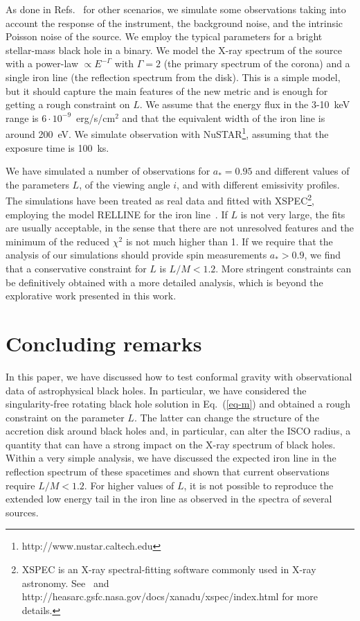 \documentclass[aps, prd, amsmath, floats, floatfix, twocolumn, nofootinbib, superscriptaddress, showpacs]{revtex4-1}
\begin{document}
As done in Refs.~\cite{p1,p2,p3,p4} for other scenarios, we simulate some observations taking into account the response of the instrument, the background noise, and the intrinsic Poisson noise of the source. We employ the typical parameters for a bright stellar-mass black hole in a binary. We model the X-ray spectrum of the source with a power-law $\propto E^{-\Gamma}$ with $\Gamma = 2$ (the primary spectrum of the corona) and a single iron line (the reflection spectrum from the disk). This is a simple model, but it should capture the main features of the new metric and is enough for getting a rough constraint on $L$. We assume that the energy flux in the 3-10~keV range is $6 \cdot 10^{-9}$~erg/s/cm$^2$ and that the equivalent width of the iron line is around 200~eV. We simulate observation with NuSTAR\footnote{http://www.nustar.caltech.edu}, assuming that the exposure time is 100~ks. 


We have simulated a number of observations for $a_* = 0.95$ and different values of the parameters $L$, of the viewing angle $i$, and with different emissivity profiles. The simulations have been treated as real data and fitted with XSPEC\footnote{XSPEC is an X-ray spectral-fitting software commonly used in X-ray astronomy. See~\cite{arn96} and http://heasarc.gsfc.nasa.gov/docs/xanadu/xspec/index.html for more details.}, employing the model RELLINE for the iron line~\cite{relline}. If $L$ is not very large, the fits are usually acceptable, in the sense that there are not unresolved features and the minimum of the reduced $\chi^2$ is not much higher than 1. If we require that the analysis of our simulations should provide spin measurements $a_* > 0.9$, we find that a conservative constraint for $L$ is $L/M < 1.2$. More stringent constraints can be definitively obtained with a more detailed analysis, which is beyond the explorative work presented in this work.





\section{Concluding remarks}

In this paper, we have discussed how to test conformal gravity with observational data of astrophysical black holes. In particular, we have considered the singularity-free rotating black hole solution in Eq.~(\ref{eq-m}) and obtained a rough constraint on the parameter $L$. The latter can change the structure of the accretion disk around black holes and, in particular, can alter the ISCO radius, a quantity that can have a strong impact on the X-ray spectrum of black holes. Within a very simple analysis, we have discussed the expected iron line in the reflection spectrum of these spacetimes and shown that current observations require $L/M < 1.2$. For higher values of $L$, it is not possible to reproduce the extended low energy tail in the iron line as observed in the spectra of several sources. 
\end{document}
